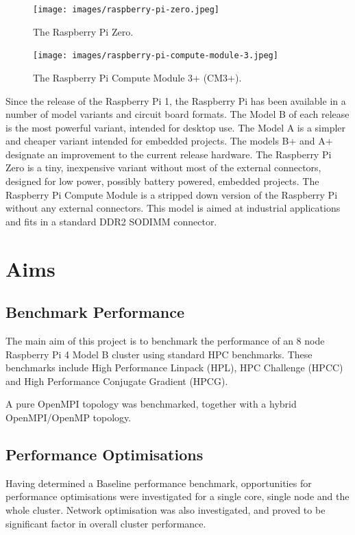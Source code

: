 \documentclass{report}
\begin{document}
\begin{figure}
	\centering	
	\texttt{[image: images/raspberry-pi-zero.jpeg]}
	\caption{The Raspberry Pi Zero.}
\end{figure}

\begin{figure}
	\centering	
	\texttt{[image: images/raspberry-pi-compute-module-3.jpeg]}
	\caption{The Raspberry Pi Compute Module 3+ (CM3+).}
\end{figure}

Since the release of the Raspberry Pi 1, the Raspberry Pi has been available in a number of model variants and circuit board formats. The Model B of each release is the most powerful variant, intended for desktop use. The Model A is a simpler and cheaper variant intended for embedded projects. The models B+ and A+ designate an improvement to the current release hardware. The Raspberry Pi Zero is a tiny, inexpensive variant without most of the external connectors, designed for low power, possibly battery powered, embedded projects. The Raspberry Pi Compute Module is a stripped down version of the Raspberry Pi without any external connectors. This model is aimed at industrial applications and fits in a standard DDR2 SODIMM connector.


%
%
\section{Aims}


%
%
\subsection{Benchmark Performance}

The main aim of this project is to benchmark the performance of an 8 node Raspberry Pi 4 Model B cluster using standard HPC benchmarks. These benchmarks include High Performance Linpack (HPL), HPC Challenge (HPCC) and High Performance Conjugate Gradient (HPCG).

A pure OpenMPI topology was benchmarked, together with a hybrid OpenMPI/OpenMP topology.


%
%
\subsection{Performance Optimisations}

Having determined a Baseline performance benchmark, opportunities for performance optimisations were investigated for a single core, single node and the whole cluster. Network optimisation was also investigated, and proved to be significant factor in overall cluster performance. 
\end{document}
